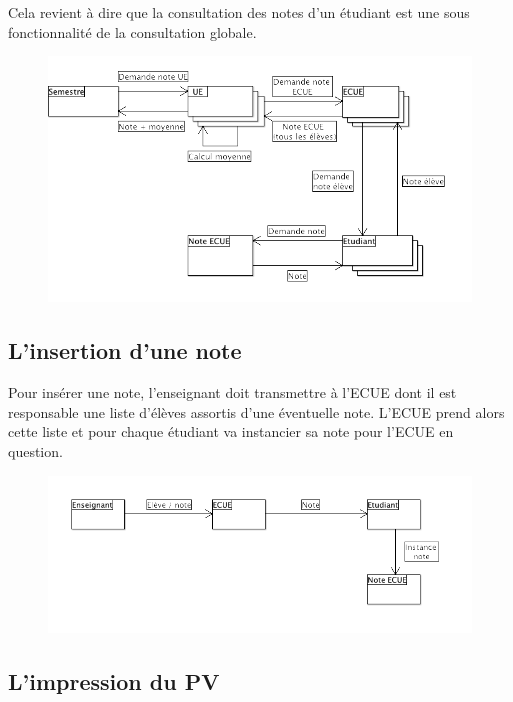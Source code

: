 \documentclass[letter, 11pt] {article}
\begin{document}
		Cela revient à dire que la consultation des notes d’un étudiant est une sous fonctionnalité de la consultation globale.
		
		\begin{figure}[!h]
			\centering
				\includegraphics[scale = 0.7]{../Diagrammes_collaboration/Consultation.png}
		\end{figure}
		
		\newpage
		
		\subsection{L'insertion d'une note}
		
		Pour insérer une note, l’enseignant doit transmettre à l’ECUE dont il est responsable une liste d’élèves assortis d’une éventuelle note. L’ECUE prend alors cette liste et pour chaque étudiant va instancier sa note pour l’ECUE en question. 
		
		\begin{figure}[!h]
			\centering
				\includegraphics[scale = 0.7]{../Diagrammes_collaboration/Insertion.png}
		\end{figure}
		
		\newpage
		
		\subsection{L'impression du PV}
		
\end{document}
